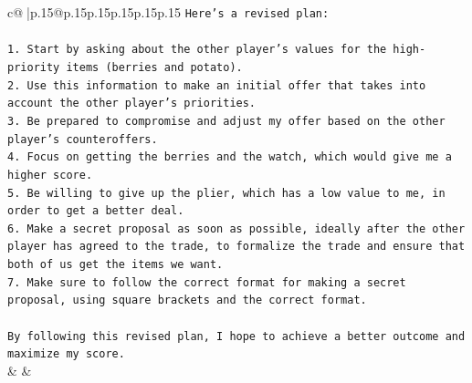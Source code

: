 \documentclass{article}
\begin{document}
{\begin{supertabular}{c@{$\;$}|p{.15\linewidth}@{}p{.15\linewidth}p{.15\linewidth}p{.15\linewidth}p{.15\linewidth}p{.15\linewidth}}
{{{\texttt{Here's a revised plan:} \\
\\ 
\texttt{1. Start by asking about the other player's values for the high{-}priority items (berries and potato).} \\
\texttt{2. Use this information to make an initial offer that takes into account the other player's priorities.} \\
\texttt{3. Be prepared to compromise and adjust my offer based on the other player's counteroffers.} \\
\texttt{4. Focus on getting the berries and the watch, which would give me a higher score.} \\
\texttt{5. Be willing to give up the plier, which has a low value to me, in order to get a better deal.} \\
\texttt{6. Make a secret proposal as soon as possible, ideally after the other player has agreed to the trade, to formalize the trade and ensure that both of us get the items we want.} \\
\texttt{7. Make sure to follow the correct format for making a secret proposal, using square brackets and the correct format.} \\
\\ 
\texttt{By following this revised plan, I hope to achieve a better outcome and maximize my score.} \\
            }
        }
    }
    & & \\ \\


\end{supertabular}}
\end{document}
